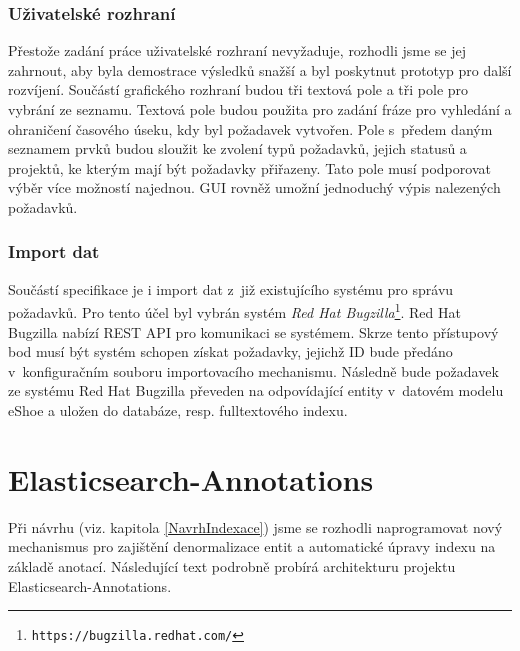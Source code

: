 \documentclass[11pt,oneside]{fithesis2}
\begin{document}
\subsection{Uživatelské rozhraní}
Přestože zadání práce uživatelské rozhraní nevyžaduje, rozhodli jsme se jej zahrnout, aby byla demostrace výsledků snažší a byl poskytnut prototyp pro další rozvíjení. Součástí grafického rozhraní budou tři textová pole a tři pole pro vybrání ze seznamu. Textová pole budou použita pro zadání fráze pro vyhledání a ohraničení časového úseku, kdy byl požadavek vytvořen. Pole s~předem daným seznamem prvků budou sloužit ke zvolení typů požadavků, jejich statusů a projektů, ke kterým mají být požadavky přiřazeny. Tato pole musí podporovat výběr více možností najednou. GUI rovněž umožní jednoduchý výpis nalezených požadavků.

\subsection{Import dat}
Součástí specifikace je i import dat z~již existujícího systému pro správu požadavků. Pro tento účel byl vybrán systém \emph{Red Hat Bugzilla}\footnote{\texttt{https://bugzilla.redhat.com/}}. Red Hat Bugzilla nabízí REST API pro komunikaci se systémem. Skrze tento přístupový bod musí být systém schopen získat požadavky, jejichž ID bude předáno v~konfiguračním souboru importovacího mechanismu. Následně bude požadavek ze systému Red Hat Bugzilla převeden na odpovídající entity v~datovém modelu eShoe a uložen do databáze, resp. fulltextového indexu.

\chapter{Elasticsearch-Annotations}
\label{ElasticsearchAnnotationsChapter}
Při návrhu (viz. kapitola \ref{NavrhIndexace}) jsme se rozhodli naprogramovat nový mechanismus pro zajištění denormalizace entit a automatické úpravy indexu na základě anotací. Následující text podrobně probírá architekturu projektu Elasticsearch-Annotations. 
\end{document}
